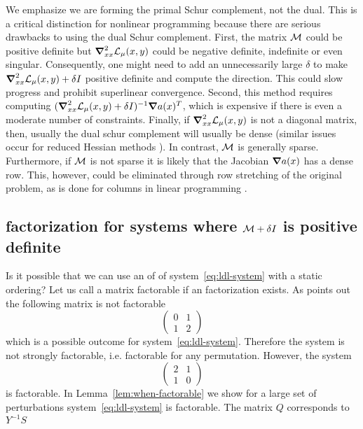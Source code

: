 \documentclass{article}
\begin{document}
We emphasize we are forming the primal Schur complement, not the dual. This is a critical distinction for nonlinear programming because there are serious drawbacks to using the dual Schur complement. First, the matrix $\mathcal{M}$ could be positive definite but $\grad_{xx}^2 \mathcal{L}_{\mu}(x,y)$ could be negative definite, indefinite or even singular. Consequently, one might need to add an unnecessarily large $\delta$ to make $\grad_{xx}^2 \mathcal{L}_{\mu}(x,y) + \delta I$ positive definite and compute the direction. This could slow progress and prohibit superlinear convergence. Second, this method requires computing $(\grad_{xx}^2 \mathcal{L}_{\mu}(x,y) + \delta I)^{-1}  \grad a(x)^T$, which is expensive if there is even a moderate number of constraints. Finally, if $\grad_{xx}^2 \mathcal{L}_{\mu}(x,y)$ is not a diagonal matrix, then, usually the dual schur complement will usually be dense (similar issues occur for reduced Hessian methods  \cite{walterThesis1,walterThesis2}). In contrast, $\mathcal{M}$ is generally sparse. Furthermore, if $\mathcal{M}$ is not sparse it is likely that the Jacobian $\grad a(x)$ has a dense row. This, however, could be eliminated through row stretching of the original problem, as is done for columns in linear programming \cite{grcar2012matrix,lustig1991formulating,vanderbei1991splitting}. 







\if{}

\subsection{\LDL{} factorization for systems where $\mathcal{M} + \delta I$ is positive definite}

Is it possible that we can use an of \LDL{} of system~\eqref{eq:ldl-system} with a static ordering? Let us call a matrix factorable if an \LDL{} factorization exists. As \citet{vanderbei1995symmetric} points out the following matrix is not factorable
$$
\left( \begin{matrix}
0 & 1 \\
1 & 2
\end{matrix} \right)
$$
which is a possible outcome for system~\eqref{eq:ldl-system}. Therefore the system is not strongly factorable, i.e. factorable for any permutation. However, the system 
$$
\left( \begin{matrix}
2 & 1 \\
1 & 0
\end{matrix} \right)
$$
is factorable. In Lemma~\ref{lem:when-factorable} we show for a large set of perturbations system~\eqref{eq:ldl-system} is factorable. The matrix $Q$ corresponds to $Y^{-1} S$
\end{document}
